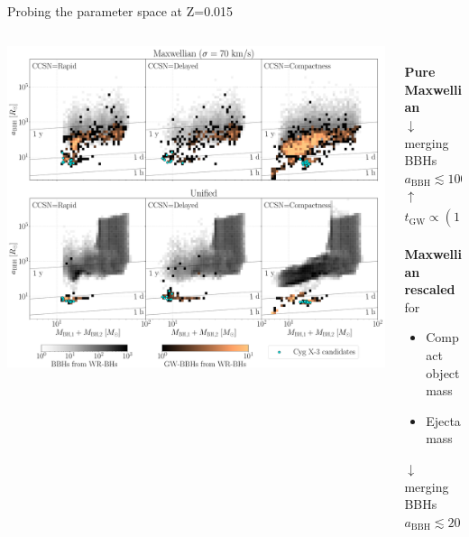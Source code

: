 \documentclass{beamer} %
\begin{document}
\begin{frame}{Probing the parameter space at Z=0.015}
		\begin{columns}
		\begin{column}{0.9\textwidth}
			\includegraphics[width=\textwidth]{./images/kickcompare_rem_015_beamer.pdf}
		\end{column}
		\begin{column}{0.25\textwidth}
			\scriptsize
			\centering
			\\
			\bigskip
			\textbf{Pure Maxwellian}\\
			$\downarrow$\\
			merging BBHs \\$a_{\text{BBH}} \lesssim 1000~R_\odot$\\
			$\uparrow$\\
			$t_{\text{GW}} \propto (1-e^2)^{7/2}$\\
			\\
			\bigskip
			\smallskip
			\textbf{Maxwellian \\ rescaled} for \\
			\begin{itemize}
				\item Compact object mass
				\item Ejecta mass
			\end{itemize}
		$\downarrow$\\
		merging BBHs \\$a_{\text{BBH}} \lesssim 20~R_\odot$
		\vspace{.5cm}
		\end{column}	
	\end{columns}
	
\end{frame}
\end{document}
